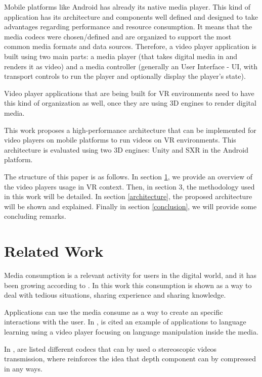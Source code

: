 \documentclass[runningheads]{llncs}
\begin{document}
Mobile platforms like Android has already its native media player. This kind of application has its architecture and components well defined and designed to take advantages regarding performance and resource consumption. It means that the media codecs were chosen/defined and are organized to support the most common media formats and data sources. Therefore, a video player application is built using two main parts: a media player (that takes digital media in and renders it as video) and a media controller (generally an User Interface - UI, with transport controls to run the player and optionally display the player's state).

Video player applications that are being built for VR environments need to have this kind of organization as well, once they are using 3D engines to render digital media.

This work proposes a high-performance architecture that can be implemented for video players on mobile platforms to run videos on VR environments. This architecture is evaluated using two 3D engines: Unity and SXR in the Android platform.

The structure of this paper is as follows. In section \ref{related-work}, we provide an overview of the video players usage in VR context. Then, in section 3, the methodology used in this work will be detailed. In section \ref{architecture}, the proposed architecture will be shown and explained. Finally in section \ref{conclusion}, we will provide some concluding remarks.


\section{Related Work} \label{related-work}


Media consumption is a relevant activity for users in the digital world, and it has been growing according to \cite{repo2004users}. In this work this consumption is shown as a way to deal with tedious situations, sharing experience and sharing knowledge.

Applications can use the media consume as a way to create an specific interactions with the user. In \cite{hu2018kalgan}, is cited an example of applications to language learning using a video player focusing on language manipulation inside the media.

In \cite{smolic2009overview}, are listed different codecs that can by used o stereoscopic videos transmission, where reinforces the idea that depth component can by compressed in any ways.
\end{document}
